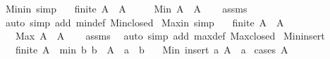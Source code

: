 \begin{isabellebody}
\isanewline
{}\isamarkupfalse%
\ Min{\isacharunderscore}{\kern0pt}in\ {\isacharbrackleft}{\kern0pt}simp{\isacharbrackright}{\kern0pt}{\isacharcolon}{\kern0pt}\isanewline
\ \ \ {\isachardoublequoteopen}finite\ A{\isachardoublequoteclose}\ \ {\isachardoublequoteopen}A\ {\isasymnoteq}\ {\isacharbraceleft}{\kern0pt}{\isacharbraceright}{\kern0pt}{\isachardoublequoteclose}\isanewline
\ \ \ {\isachardoublequoteopen}Min\ A\ {\isasymin}\ A{\isachardoublequoteclose}\isanewline
%
\isadelimproof
\ \ %
\endisadelimproof
%
\isatagproof
{}\isamarkupfalse%
\ assms\ \isamarkupfalse%
\ {\isacharparenleft}{\kern0pt}auto\ simp\ add{\isacharcolon}{\kern0pt}\ min{\isacharunderscore}{\kern0pt}def\ Min{\isachardot}{\kern0pt}closed{\isacharparenright}{\kern0pt}%
\endisatagproof
{\isafoldproof}%
%
\isadelimproof
\isanewline
%
\endisadelimproof
\isanewline
{}\isamarkupfalse%
\ Max{\isacharunderscore}{\kern0pt}in\ {\isacharbrackleft}{\kern0pt}simp{\isacharbrackright}{\kern0pt}{\isacharcolon}{\kern0pt}\isanewline
\ \ \ {\isachardoublequoteopen}finite\ A{\isachardoublequoteclose}\ \ {\isachardoublequoteopen}A\ {\isasymnoteq}\ {\isacharbraceleft}{\kern0pt}{\isacharbraceright}{\kern0pt}{\isachardoublequoteclose}\isanewline
\ \ \ {\isachardoublequoteopen}Max\ A\ {\isasymin}\ A{\isachardoublequoteclose}\isanewline
%
\isadelimproof
\ \ %
\endisadelimproof
%
\isatagproof
{}\isamarkupfalse%
\ assms\ \isamarkupfalse%
\ {\isacharparenleft}{\kern0pt}auto\ simp\ add{\isacharcolon}{\kern0pt}\ max{\isacharunderscore}{\kern0pt}def\ Max{\isachardot}{\kern0pt}closed{\isacharparenright}{\kern0pt}%
\endisatagproof
{\isafoldproof}%
%
\isadelimproof
\isanewline
%
\endisadelimproof
\isanewline
{}\isamarkupfalse%
\ Min{\isacharunderscore}{\kern0pt}insert{}{\isacharcolon}{\kern0pt}\isanewline
\ \ \ {\isachardoublequoteopen}finite\ A{\isachardoublequoteclose}\ \ min{\isacharcolon}{\kern0pt}\ {\isachardoublequoteopen}{\isasymAnd}b{\isachardot}{\kern0pt}\ b\ {\isasymin}\ A\ {\isasymLongrightarrow}\ a\ {\isasymle}\ b{\isachardoublequoteclose}\isanewline
\ \ \ {\isachardoublequoteopen}Min\ {\isacharparenleft}{\kern0pt}insert\ a\ A{\isacharparenright}{\kern0pt}\ {\isacharequal}{\kern0pt}\ a{\isachardoublequoteclose}\isanewline
%
\isadelimproof
%
\endisadelimproof
%
\isatagproof
{}\isamarkupfalse%
\ {\isacharparenleft}{\kern0pt}cases\ {\isachardoublequoteopen}A\ {\isacharequal}{\kern0pt}\ {\isacharbraceleft}{\kern0pt}{\isacharbraceright}{\kern0pt}{\isachardoublequoteclose}{\isacharparenright}{\kern0pt}\isanewline

\end{isabellebody}
